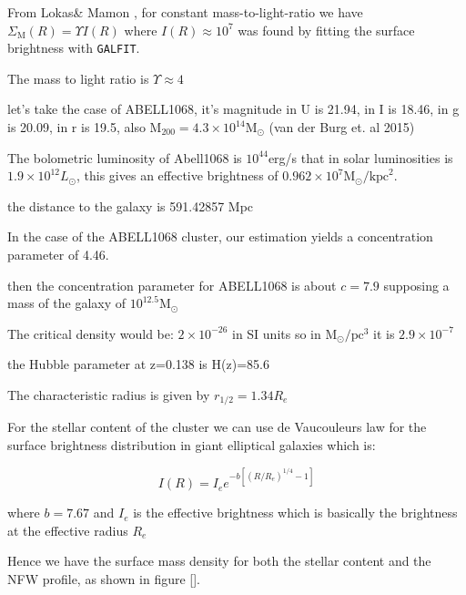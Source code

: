 From Lokas\& Mamon \citeyear{Reference14}, for constant mass-to-light-ratio we have $\Sigma_{\text{M}}(R)= \Upsilon I(R)$ where $I(R)\approx 10^{7}$ was found by fitting the surface brightness with \texttt{GALFIT}.

The mass to light ratio is $\Upsilon\approx 4$

let's take the case of ABELL1068, it's magnitude in U is 21.94, in I is 18.46, in g is 20.09, in r is 19.5, also $\text{M}_{200}=4.3\times 10^{14}\text{M}_{\odot}$ (van der Burg et. al 2015)

The bolometric luminosity of Abell1068 is $10^{44}$erg/s that in solar luminosities is $1.9\times 10^{12} L_{\odot}$, this gives an effective brightness of $0.962\times 10^{7}\text{M}_{\odot}/\text{kpc}^2$.

the distance to the galaxy is 591.42857 Mpc

In the case of the ABELL1068 cluster, our estimation yields a concentration parameter of 4.46.

then the concentration parameter for ABELL1068 is about $c=7.9$ supposing a mass of the galaxy of $10^{12.5}\text{M}_{\odot}$

The critical density would be: $2\times 10^{-26}$ in SI units so in $\text{M}_{\odot}/\text{pc}^{3}$ it is $2.9\times 10^{-7}$

the Hubble parameter at z=0.138 is H(z)=85.6

The characteristic radius is given by $r_{1/2}=1.34R_{e}$

For the stellar content of the cluster we can use de Vaucouleurs law for the surface brightness distribution in giant elliptical galaxies which is:

\begin{equation}
I(R)=I_{e}e^{-b\left[\left(R/R_{e}\right)^{1/4}-1\right]}
\end{equation}

where $b=7.67$ and $I_{e}$ is the effective brightness which is basically the brightness at the effective radius $R_{e}$

Hence we have the surface mass density for both the stellar content and the NFW profile, as shown in figure [].

